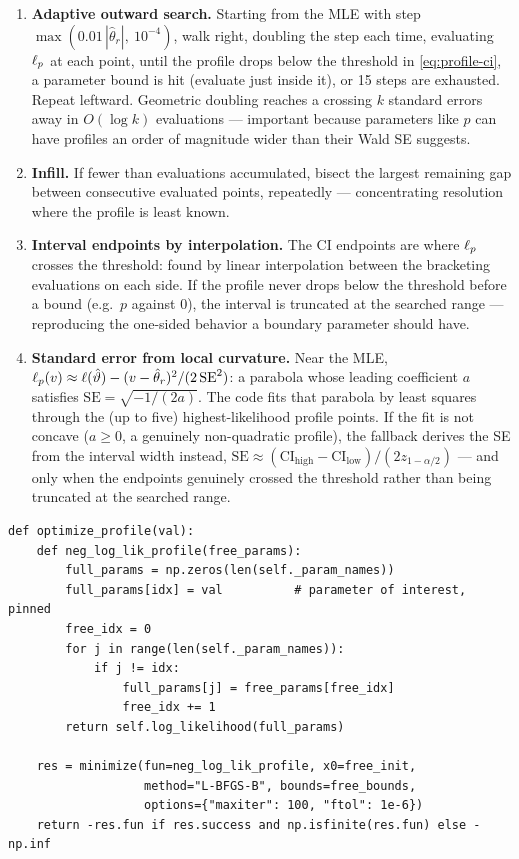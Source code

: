 \begin{enumerate}
  \item \textbf{Adaptive outward search.} Starting from the MLE with step
        $\max(0.01\,|\hat\theta_r|,\ 10^{-4})$, walk right, doubling the
        step each time, evaluating $\ell_p$ at each point, until the
        profile drops below the threshold in \eqref{eq:profile-ci}, a
        parameter bound is hit (evaluate just inside it), or 15 steps are
        exhausted. Repeat leftward. Geometric doubling reaches a crossing
        $k$ standard errors away in $O(\log k)$ evaluations --- important
        because parameters like $p$ can have profiles an order of
        magnitude wider than their Wald SE suggests.
  \item \textbf{Infill.} If fewer than  evaluations
        accumulated, bisect the largest remaining gap between consecutive
        evaluated points, repeatedly --- concentrating resolution where
        the profile is least known.
  \item \textbf{Interval endpoints by interpolation.} The CI endpoints are
        where $\ell_p$ crosses the threshold: found by linear
        interpolation between the bracketing evaluations on each side. If
        the profile never drops below the threshold before a bound (e.g.\
        $p$ against $0$), the interval is truncated at the searched range
        --- reproducing the one-sided behavior a boundary parameter should
        have.
  \item \textbf{Standard error from local curvature.} Near the MLE,
        $\ell_p(v) \approx \ell(\hat{\vartheta}) -
        (v - \hat\theta_r)^2 / (2\,\mathrm{SE}^2)$: a parabola whose
        leading coefficient $a$ satisfies
        $\mathrm{SE} = \sqrt{-1/(2a)}$. The code fits that parabola by
        least squares through the (up to five) highest-likelihood profile
        points. If the fit is not concave ($a \ge 0$, a genuinely
        non-quadratic profile), the fallback derives the SE from the
        interval width instead, $\mathrm{SE} \approx
        (\mathrm{CI}_{\mathrm{high}} - \mathrm{CI}_{\mathrm{low}}) /
        (2 z_{1-\alpha/2})$ --- and only when the endpoints genuinely
        crossed the threshold rather than being truncated at the searched
        range.
\end{enumerate}

\begin{lstlisting}[caption={The profiled objective: pin $\theta_r$, optimize the rest (excerpt).}]
def optimize_profile(val):
    def neg_log_lik_profile(free_params):
        full_params = np.zeros(len(self._param_names))
        full_params[idx] = val          # parameter of interest, pinned
        free_idx = 0
        for j in range(len(self._param_names)):
            if j != idx:
                full_params[j] = free_params[free_idx]
                free_idx += 1
        return self.log_likelihood(full_params)

    res = minimize(fun=neg_log_lik_profile, x0=free_init,
                   method="L-BFGS-B", bounds=free_bounds,
                   options={"maxiter": 100, "ftol": 1e-6})
    return -res.fun if res.success and np.isfinite(res.fun) else -np.inf
\end{lstlisting}

